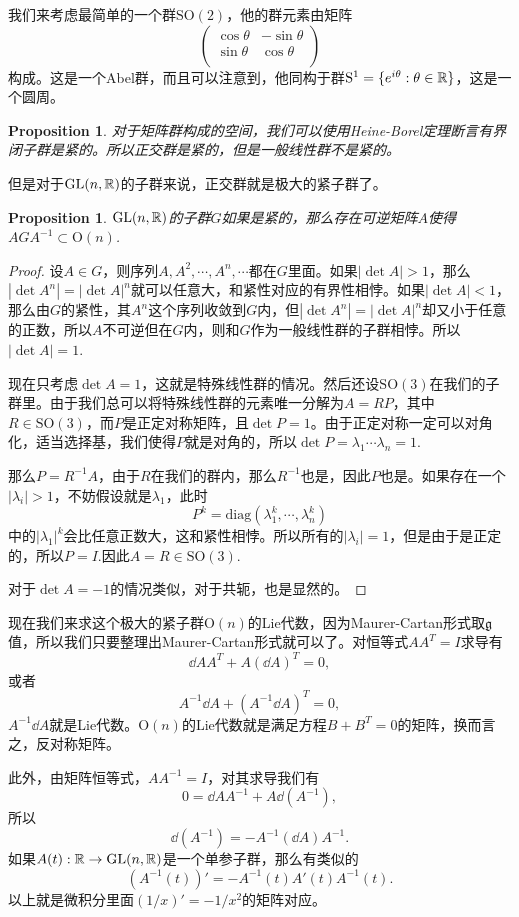 \documentclass[9pt]{extbook}
\theoremstyle{plain}
\newtheorem{pro}[defi]{Proposition}
\newcommand{\lag}{{\mathfrak{g}}}  %
\begin{document}
我们来考虑最简单的一个群$\mathrm{SO}(2)$，他的群元素由矩阵
\[
	\begin{pmatrix}
	\cos \theta&-\sin \theta\\
	\sin \theta&\cos \theta\\
	\end{pmatrix}
\]
构成。这是一个Abel群，而且可以注意到，他同构于群$\mathrm{S}^1=\{e^{i\theta}:\theta\in\mathbb{R}\}$，这是一个圆周。
\begin{pro}
对于矩阵群构成的空间，我们可以使用Heine-Borel定理断言有界闭子群是紧的。所以正交群是紧的，但是一般线性群不是紧的。
\end{pro}
但是对于$\mathrm{GL}(n,\mathbb{R})$的子群来说，正交群就是极大的紧子群了。
\begin{pro}
$\mathrm{GL}(n,\mathbb{R})$的子群$G$如果是紧的，那么存在可逆矩阵$A$使得$AGA^{-1}\subset \mathrm{O}(n)$.
\end{pro}
\begin{proof}
设$A\in G$，则序列$A,A^2,\cdots,A^n,\cdots$都在$G$里面。如果$|\det A|>1$，那么$|\det A^n|=|\det A|^n$就可以任意大，和紧性对应的有界性相悖。如果$|\det A|<1$，那么由$G$的紧性，其$A^n$这个序列收敛到$G$内，但$|\det A^n|=|\det A|^n$却又小于任意的正数，所以$A$不可逆但在$G$内，则和$G$作为一般线性群的子群相悖。所以$|\det A|=1$.

现在只考虑$\det A=1$，这就是特殊线性群的情况。然后还设$\mathrm{SO}(3)$在我们的子群里。由于我们总可以将特殊线性群的元素唯一分解为$A=RP$，其中$R\in \mathrm{SO}(3)$，而$P$是正定对称矩阵，且$\det P=1$。由于正定对称一定可以对角化，适当选择基，我们使得$P$就是对角的，所以$\det P=\lambda_1\cdots\lambda_n=1$.

那么$P=R^{-1}A$，由于$R$在我们的群内，那么$R^{-1}$也是，因此$P$也是。如果存在一个$|\lambda_i|>1$，不妨假设就是$\lambda_1$，此时
\[
P^{k}=\mathrm{diag}(\lambda_1^k,\cdots,\lambda_n^k)
\]
中的$|\lambda_1|^k$会比任意正数大，这和紧性相悖。所以所有的$|\lambda_i|=1$，但是由于是正定的，所以$P=I$.因此$A=R\in\mathrm{SO}(3)$.

对于$\det A=-1$的情况类似，对于共轭，也是显然的。
\end{proof}

现在我们来求这个极大的紧子群$\mathrm{O}(n)$的Lie代数，因为Maurer-Cartan形式取$\lag$值，所以我们只要整理出Maurer-Cartan形式就可以了。对恒等式$AA^T=I$求导有
\[
	\dd A A^T+A(\dd A)^T=0,
\]
或者
\[
	A^{-1}\dd A+(A^{-1}\dd A)^T=0,
\]
$A^{-1}\dd A$就是Lie代数。$\mathrm{O}(n)$的Lie代数就是满足方程$B+B^T=0$的矩阵，换而言之，反对称矩阵。

此外，由矩阵恒等式，$AA^{-1}=I$，对其求导我们有
\[
0=\dd A A^{-1}+A\dd(A^{-1}),
\]
所以
\[
\dd(A^{-1})=-A^{-1}(\dd A) A^{-1}.
\]
如果$A(t):\mathbb{R} \to \mathrm{GL}(n,\mathbb{R})$是一个单参子群，那么有类似的
\[
(A^{-1}(t))'=-A^{-1}(t)A'(t) A^{-1}(t).
\]
以上就是微积分里面$(1/x)'=-1/x^2$的矩阵对应。
\end{document}
